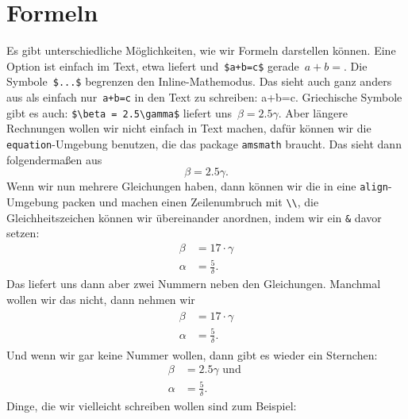 \documentclass[a4paper]{article}
\begin{document}
\section{Formeln}
Es gibt unterschiedliche Möglichkeiten, wie wir Formeln darstellen können.
Eine Option ist einfach im Text, etwa liefert und~\verb|$a+b=c$| gerade~$a+b=$.
Die Symbole~\verb|$...$| begrenzen den Inline-Mathemodus.
Das sieht auch ganz anders aus als einfach nur~\verb|a+b=c| in den Text zu
schreiben: a+b=c.
Griechische Symbole gibt es auch:
\verb|$\beta = 2.5\gamma$| liefert uns~$\beta = 2.5\gamma$.
Aber längere Rechnungen wollen wir nicht einfach in Text machen, dafür können
wir die \verb|equation|-Umgebung benutzen, die das package \verb|amsmath|
braucht.  Das sieht dann folgendermaßen aus
\begin{equation}
  \beta = 2.5\gamma.
\end{equation}
Wenn wir nun mehrere Gleichungen haben, dann können wir die in eine
\verb|align|-Umgebung packen und machen einen Zeilenumbruch mit \verb|\\|, die
Gleichheitszeichen können wir übereinander anordnen, indem wir ein \verb|&|
davor setzen:
\begin{align}
  \beta &= 17\cdot \gamma \\
  \alpha &= \frac{5}{\delta}.
\end{align}
Das liefert uns dann aber zwei Nummern neben den Gleichungen.
Manchmal wollen wir das nicht, dann nehmen wir
\begin{align}
  \begin{split}
     \beta &= 17\cdot \gamma \label{eq:ladida}\\
    \alpha &= \frac{5}{\delta}.
  \end{split}
\end{align}
Und wenn wir gar keine Nummer wollen, dann gibt es wieder ein Sternchen:
\begin{align*}
  \beta &= 2.5\gamma \text{ und } \\
  \alpha &= \frac{5}{\delta}.
\end{align*}
Dinge, die wir vielleicht schreiben wollen sind zum Beispiel:
\end{document}
